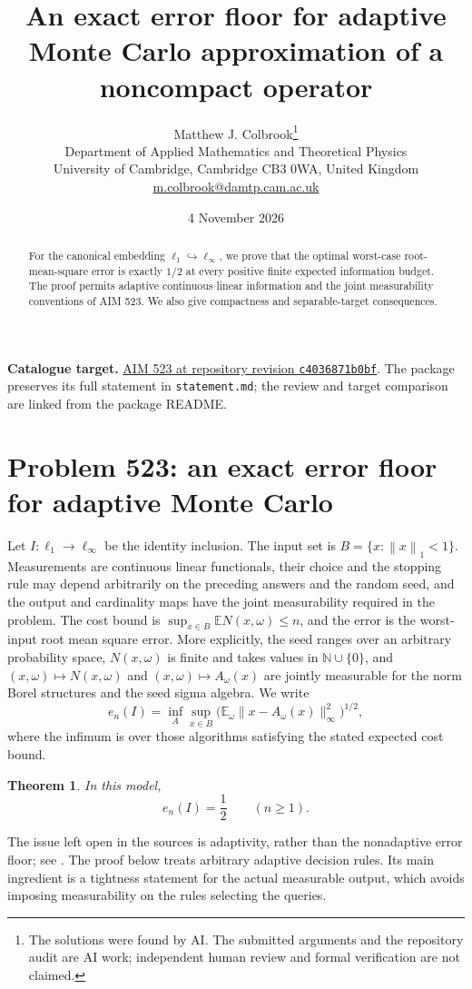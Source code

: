 \documentclass[11pt,a4paper]{article}
\title{An exact error floor for adaptive Monte Carlo approximation of a noncompact operator}
\author{Matthew J. Colbrook\thanks{The solutions were found by AI. The submitted arguments and the repository audit are AI work; independent human review and formal verification are not claimed.}\\[4pt]
\small Department of Applied Mathematics and Theoretical Physics\\
\small University of Cambridge, Cambridge CB3 0WA, United Kingdom\\
\small\href{mailto:m.colbrook@damtp.cam.ac.uk}{m.colbrook@damtp.cam.ac.uk}}
\date{4 November 2026}
\newcommand{\N}{\mathbb N}
\newcommand{\E}{\mathbb E}
\newcommand{\norm}[1]{\left\lVert#1\right\rVert}
\newtheorem{theorem}{Theorem}[section]
\theoremstyle{definition}
\theoremstyle{remark}
\numberwithin{equation}{section}
\begin{document}
\maketitle
\begin{abstract}
For the canonical embedding $\ell_1\hookrightarrow\ell_\infty$, we prove that the optimal worst-case root-mean-square error is exactly $1/2$ at every positive finite expected information budget. The proof permits adaptive continuous linear information and the joint measurability conventions of AIM 523. We also give compactness and separable-target consequences.
\end{abstract}
\noindent\textbf{Catalogue target.} \href{https://github.com/MColbrook/AIM/blob/c4036871b0bf15cbc83e79c780b7191bcbb2cfed/problems/523-can-adaptive-monte-carlo-approximate-a-noncompact-operator.md}{AIM 523 at repository revision \texttt{c4036871b0bf}}. The package preserves its full statement in \texttt{statement.md}; the review and target comparison are linked from the package README.
\medskip

\section{Problem 523: an exact error floor for adaptive Monte Carlo}
\label{sec:523}

Let \(I:\ell_1\to\ell_\infty\) be the identity inclusion. The input set is
\(B=\{x:\norm{x}_1<1\}\). Measurements are continuous linear functionals,
their choice and the stopping rule may depend arbitrarily on the preceding
answers and the random seed, and the output and cardinality maps have the
joint measurability required in the problem. The cost bound is
\(\sup_{x\in B}\E N(x,\omega)\le n\), and the error is the worst-input
root mean square error. More explicitly, the seed ranges over an arbitrary probability space, $N(x,\omega)$ is finite and takes values in $\N\cup\{0\}$, and $(x,\omega)\mapsto N(x,\omega)$ and $(x,\omega)\mapsto A_\omega(x)$ are jointly measurable for the norm Borel structures and the seed sigma algebra. We write
\[
e_n(I)=\inf_A\sup_{x\in B}\bigl(\E_\omega\|x-A_\omega(x)\|_\infty^2\bigr)^{1/2},
\]
where the infimum is over those algorithms satisfying the stated expected cost bound.

\begin{theorem}
\label{thm:523}
In this model,
\[
                 \boxed{e_n(I)=\frac12\qquad(n\ge1).}
\]
\end{theorem}

The issue left open in the sources is adaptivity, rather than the
nonadaptive error floor; see \cite{hnw2011,knw2024}. The proof below treats arbitrary
adaptive decision rules. Its main ingredient is a tightness statement for
the actual measurable output, which avoids imposing measurability on the
rules selecting the queries.
\end{document}
